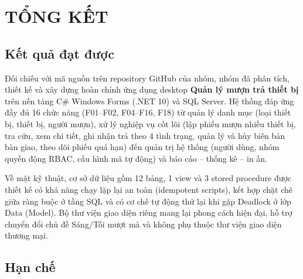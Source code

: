 \chapter{TỔNG KẾT}

\section{Kết quả đạt được}

Đối chiếu với mã nguồn trên repository GitHub của nhóm, nhóm đã phân tích, thiết kế và xây dựng hoàn chỉnh ứng dụng desktop \textbf{Quản lý mượn trả thiết bị} trên nền tảng C\# Windows Forms (.NET 10) và SQL Server. Hệ thống đáp ứng đầy đủ 16 chức năng (F01–F02, F04–F16, F18) từ quản lý danh mục (loại thiết bị, thiết bị, người mượn), xử lý nghiệp vụ cốt lõi (lập phiếu mượn nhiều thiết bị, tra cứu, xem chi tiết, ghi nhận trả theo 4 tình trạng, quản lý và hủy biên bản bàn giao, theo dõi phiếu quá hạn) đến quản trị hệ thống (người dùng, nhóm quyền động RBAC, cấu hình mã tự động) và báo cáo – thống kê – in ấn.


Về mặt kỹ thuật, cơ sở dữ liệu gồm 12 bảng, 1 view và 3 stored procedure được thiết kế có khả năng chạy lặp lại an toàn (idempotent scripts), kết hợp chặt chẽ giữa ràng buộc  ở tầng SQL và  có cơ chế tự động thử lại khi gặp Deadlock ở lớp Data (Model). Bộ thư viện giao diện riêng  mang lại phong cách hiện đại, hỗ trợ chuyển đổi chủ đề Sáng/Tối mượt mà và không phụ thuộc thư viện giao diện thương mại.


\section{Hạn chế}

